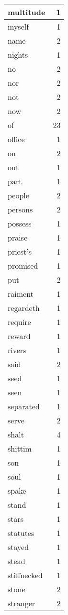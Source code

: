 \begin{center}
\begin{longtable}{l|r}
multitude & 1 \\ \hline
myself & 1 \\ \hline
name & 2 \\ \hline
nights & 1 \\ \hline
no & 2 \\ \hline
nor & 2 \\ \hline
not & 2 \\ \hline
now & 2 \\ \hline
of & 23 \\ \hline
office & 1 \\ \hline
on & 2 \\ \hline
out & 1 \\ \hline
part & 1 \\ \hline
people & 2 \\ \hline
persons & 2 \\ \hline
possess & 1 \\ \hline
praise & 1 \\ \hline
priest's & 1 \\ \hline
promised & 1 \\ \hline
put & 2 \\ \hline
raiment & 1 \\ \hline
regardeth & 1 \\ \hline
require & 1 \\ \hline
reward & 1 \\ \hline
rivers & 1 \\ \hline
said & 2 \\ \hline
seed & 1 \\ \hline
seen & 1 \\ \hline
separated & 1 \\ \hline
serve & 2 \\ \hline
shalt & 4 \\ \hline
shittim & 1 \\ \hline
son & 1 \\ \hline
soul & 1 \\ \hline
spake & 1 \\ \hline
stand & 1 \\ \hline
stars & 1 \\ \hline
statutes & 1 \\ \hline
stayed & 1 \\ \hline
stead & 1 \\ \hline
stiffnecked & 1 \\ \hline
stone & 2 \\ \hline
stranger & 2 \\ \hline

\end{longtable}
\end{center}
